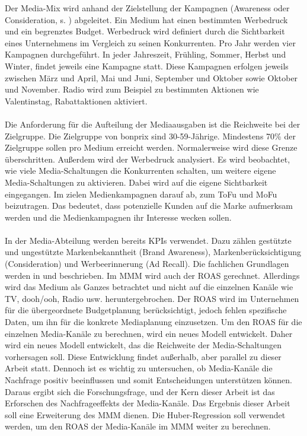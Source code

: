 Der Media-Mix wird anhand der Zielstellung der Kampagnen (Awareness oder Consideration, s. ) abgeleitet. Ein Medium hat einen bestimmten Werbedruck und ein begrenztes Budget. Werbedruck wird definiert durch die Sichtbarkeit eines Unternehmens im Vergleich zu seinen Konkurrenten. Pro Jahr werden vier Kampagnen durchgeführt. In jeder Jahreszeit, Frühling, Sommer, Herbst und Winter, findet jeweils eine Kampagne statt. Diese Kampagnen erfolgen jeweils zwischen März und April, Mai und Juni, September und Oktober sowie Oktober und November. Radio wird zum Beispiel zu bestimmten Aktionen wie Valentinstag, Rabattaktionen aktiviert.\\\\
Die Anforderung für die Aufteilung der Mediaausgaben ist die Reichweite bei der Zielgruppe. Die Zielgruppe von bonprix sind 30-59-Jährige. Mindestens 70\% der Zielgruppe sollen pro Medium erreicht werden. Normalerweise wird diese Grenze überschritten. Außerdem wird der Werbedruck analysiert. Es wird beobachtet, wie viele Media-Schaltungen die Konkurrenten schalten, um weitere eigene Media-Schaltungen zu aktivieren. Dabei wird auf die eigene Sichtbarkeit eingegangen. Im  zielen Medienkampagnen darauf ab, zum \ac{ToFu} und \ac{MoFu} beizutragen. Das bedeutet, dass potenzielle Kunden auf die Marke aufmerksam werden und die Medienkampagnen ihr Interesse wecken sollen. \\\\
In der Media-Abteilung werden bereits \ac{KPI}s verwendet. Dazu zählen gestützte und ungestützte Markenbekanntheit (Brand Awareness), Markenberücksichtigung (Consideration) und Werbeerinnerung (Ad Recall). Die fachlichen Grundlagen werden in  und  beschrieben. Im \ac{MMM} wird auch der \ac{ROAS} gerechnet. Allerdings wird das Medium als Ganzes betrachtet und nicht auf die einzelnen Kanäle wie TV, \ac{dooh}/\ac{ooh}, Radio usw. heruntergebrochen. Der ROAS wird im Unternehmen für die übergeordnete Budgetplanung berücksichtigt, jedoch fehlen spezifische Daten, um ihn für die konkrete Mediaplanung einzusetzen. Um den ROAS für die einzelnen Media-Kanäle zu berechnen, wird ein neues Modell entwickelt. Daher wird ein neues Modell entwickelt, das die Reichweite der Media-Schaltungen vorhersagen soll. Diese Entwicklung findet außerhalb, aber parallel zu dieser Arbeit statt. Dennoch ist es wichtig zu untersuchen, ob Media-Kanäle die Nachfrage positiv beeinflussen und somit Entscheidungen unterstützen können. Daraus ergibt sich die Forschungsfrage, und der Kern dieser Arbeit ist das Erforschen des Nachfrageeffekts der Media-Kanäle. Das Ergebnis dieser Arbeit soll eine Erweiterung des \ac{MMM} dienen. Die Huber-Regression soll verwendet werden, um den \ac{ROAS} der Media-Kanäle im \ac{MMM} weiter zu berechnen. \\\\
